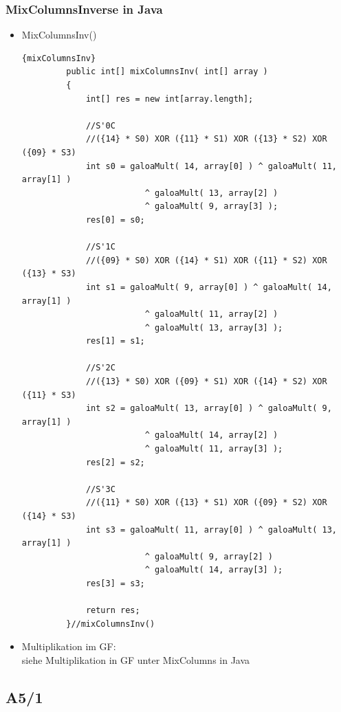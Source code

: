  \subsubsection{MixColumnsInverse in Java}
 \begin{itemize}
     \item MixColumnsInv()
     \begin{lstlisting}[caption=mixColumnsInv]{mixColumnsInv}
         public int[] mixColumnsInv( int[] array )
         {
             int[] res = new int[array.length];

             //S'0C
             //({14} * S0) XOR ({11} * S1) XOR ({13} * S2) XOR ({09} * S3)
             int s0 = galoaMult( 14, array[0] ) ^ galoaMult( 11, array[1] )
                         ^ galoaMult( 13, array[2] )
                         ^ galoaMult( 9, array[3] );
             res[0] = s0;

             //S'1C
             //({09} * S0) XOR ({14} * S1) XOR ({11} * S2) XOR ({13} * S3)
             int s1 = galoaMult( 9, array[0] ) ^ galoaMult( 14, array[1] )
                         ^ galoaMult( 11, array[2] )
                         ^ galoaMult( 13, array[3] );
             res[1] = s1;

             //S'2C
             //({13} * S0) XOR ({09} * S1) XOR ({14} * S2) XOR ({11} * S3)
             int s2 = galoaMult( 13, array[0] ) ^ galoaMult( 9, array[1] )
                         ^ galoaMult( 14, array[2] )
                         ^ galoaMult( 11, array[3] );
             res[2] = s2;

             //S'3C
             //({11} * S0) XOR ({13} * S1) XOR ({09} * S2) XOR ({14} * S3)
             int s3 = galoaMult( 11, array[0] ) ^ galoaMult( 13, array[1] )
                         ^ galoaMult( 9, array[2] )
                         ^ galoaMult( 14, array[3] );
             res[3] = s3;

             return res;
         }//mixColumnsInv()
     \end{lstlisting}

     \item Multiplikation im GF:\\
     siehe Multiplikation in GF unter MixColumns in Java
 \end{itemize}

	

\subsection{A5/1}

